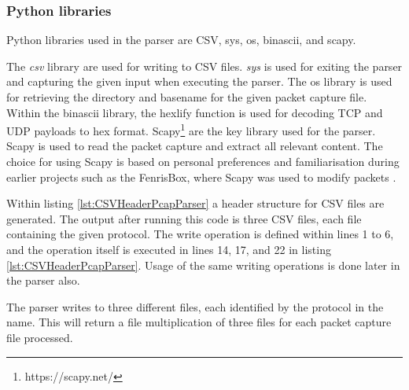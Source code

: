 \subsubsection{Python libraries}
Python libraries used in the parser are CSV, sys, os, binascii, and scapy.

The \textit{csv} library are used for writing to CSV files. \textit{sys} is used for exiting the parser and capturing the given input when executing the parser. The os library is used for retrieving the directory and basename for the given packet capture file.
Within the binascii library, the hexlify function is used for decoding TCP and UDP payloads to hex format.
Scapy\footnote{https://scapy.net/} are the key library used for the parser. Scapy is used to read the packet capture and extract all relevant content.
The choice for using Scapy is based on personal preferences and familiarisation during earlier projects such as the FenrisBox, where Scapy was used to modify packets \autocite{Jacobsen_FenrisBox_2021}.

Within listing \ref{lst:CSVHeaderPcapParser} a header structure for CSV files are generated.
The output after running this code is three CSV files, each file containing the given protocol.
The write operation is defined within lines 1 to 6, and the operation itself is executed in lines 14, 17, and 22 in listing \ref{lst:CSVHeaderPcapParser}. Usage of the same writing operations is done later in the parser also.

The parser writes to three different files, each identified by the protocol in the name. This will return a file multiplication of three files for each packet capture file processed.


